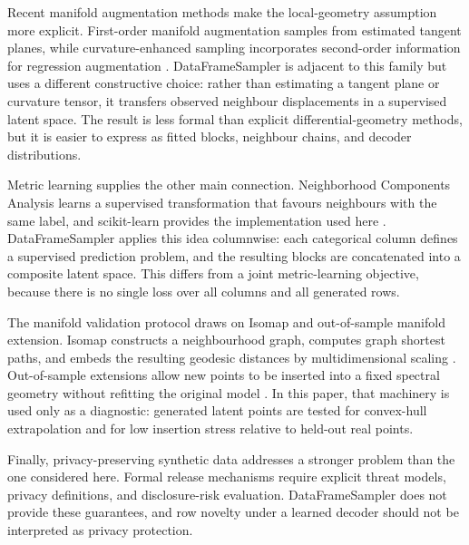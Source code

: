 Recent manifold augmentation methods make the local-geometry assumption more
explicit. First-order manifold augmentation samples from estimated tangent
planes, while curvature-enhanced sampling incorporates second-order
information for regression augmentation
\citep{kaufman2024foma,kaufman2025cems}. DataFrameSampler is adjacent to this
family but uses a different constructive choice: rather than estimating a
tangent plane or curvature tensor, it transfers observed neighbour
displacements in a supervised latent space. The result is less formal than
explicit differential-geometry methods, but it is easier to express as fitted
blocks, neighbour chains, and decoder distributions.

Metric learning supplies the other main connection. Neighborhood Components
Analysis learns a supervised transformation that favours neighbours with the
same label, and scikit-learn provides the implementation used here
\citep{pedregosa2011scikit}. DataFrameSampler applies this idea columnwise:
each categorical column defines a supervised prediction problem, and the
resulting blocks are concatenated into a composite latent space. This differs
from a joint metric-learning objective, because there is no single loss over
all columns and all generated rows.

The manifold validation protocol draws on Isomap and out-of-sample manifold
extension. Isomap constructs a neighbourhood graph, computes graph shortest
paths, and embeds the resulting geodesic distances by multidimensional scaling
\citep{tenenbaum2000isomap}. Out-of-sample extensions allow new points to be
inserted into a fixed spectral geometry without refitting the original model
\citep{bengio2003outofsample}. In this paper, that machinery is used only as a
diagnostic: generated latent points are tested for convex-hull extrapolation
and for low insertion stress relative to held-out real points.

Finally, privacy-preserving synthetic data addresses a stronger problem than
the one considered here. Formal release mechanisms require explicit threat
models, privacy definitions, and disclosure-risk evaluation. DataFrameSampler
does not provide these guarantees, and row novelty under a learned decoder
should not be interpreted as privacy protection.
